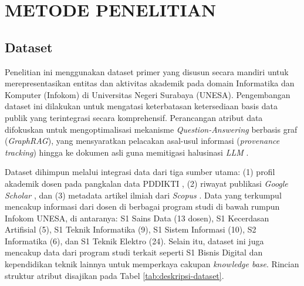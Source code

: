 \chapter{METODE PENELITIAN}

\section{Dataset}

Penelitian ini menggunakan dataset primer yang disusun secara mandiri untuk merepresentasikan entitas dan aktivitas akademik pada domain Informatika dan Komputer (Infokom) di Universitas Negeri Surabaya (UNESA). Pengembangan dataset ini dilakukan untuk mengatasi keterbatasan ketersediaan basis data publik yang terintegrasi secara komprehensif. Perancangan atribut data difokuskan untuk mengoptimalisasi mekanisme \textit{Question-Answering} berbasis graf (\textit{GraphRAG}), yang mensyaratkan pelacakan asal-usul informasi (\textit{provenance tracking}) hingga ke dokumen asli guna memitigasi halusinasi \textit{LLM} \cite{zheng2024medsumgraph}.

Dataset dihimpun melalui integrasi data dari tiga sumber utama: (1) profil akademik dosen pada pangkalan data PDDIKTI \citep{pddikti_db}, (2) riwayat publikasi \textit{Google Scholar} \citep{google_scholar}, dan (3) metadata artikel ilmiah dari \textit{Scopus} \citep{scopus_db}. Data yang terkumpul mencakup informasi dari dosen di berbagai program studi di bawah rumpun Infokom UNESA, di antaranya: S1 Sains Data (13 dosen), S1 Kecerdasan Artifisial (5), S1 Teknik Informatika (9), S1 Sistem Informasi (10), S2 Informatika (6), dan S1 Teknik Elektro (24). Selain itu, dataset ini juga mencakup data dari program studi terkait seperti S1 Bisnis Digital dan kependidikan teknik lainnya untuk memperkaya cakupan \textit{knowledge base}. Rincian struktur atribut disajikan pada Tabel \ref{tab:deskripsi-dataset}.

